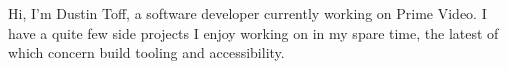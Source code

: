 \parbox {\textwidth} {
    Hi, I'm Dustin Toff, a software developer currently working on Prime Video. I have a quite few side projects I enjoy working on in my spare time, the latest of which concern build tooling and accessibility.
}%
